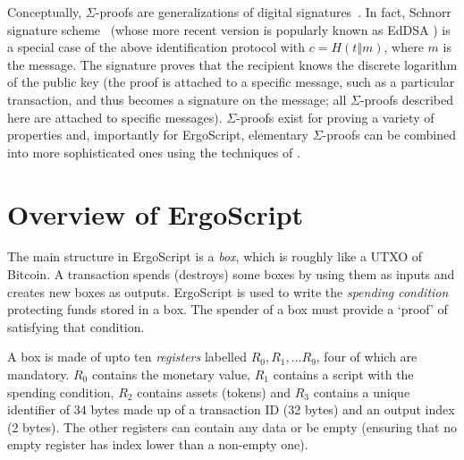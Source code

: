 \documentclass[11pt]{article}
\newcommand{\langname}{ErgoScript\xspace}
\begin{document}
{Conceptually, $\Sigma$-proofs are generalizations of digital signatures~\cite{CL06}.
In fact, Schnorr signature scheme~\cite{Sch91} (whose more recent version is popularly known as EdDSA \cite{BDLSY12,rfc8032}) is a special case of the above identification protocol with $c = H(t \Vert m)$, where $m$ is the message. The signature proves that the recipient knows the discrete logarithm of the public key (the proof is attached to a specific message, such as a particular transaction, and thus becomes a signature on the message; all $\Sigma$-proofs described here are attached to specific messages). $\Sigma$-proofs exist for proving a variety of properties and, importantly for \langname, elementary $\Sigma$-proofs can be combined into more sophisticated ones using the techniques of \cite{CDS94}. 
}

\section{Overview of \langname}
 
 The main structure in \langname is a \emph{box}, which is roughly like a UTXO of Bitcoin. A transaction spends (destroys) some boxes by using them as inputs and creates new boxes as outputs.  \langname is used to write the {\em spending condition} protecting funds stored in a box. The spender of a box must provide a `proof' of satisfying that condition. 
 
 A box is made of upto ten {\em registers} labelled $R_0, R_1,\ldots R_9$, four of which are mandatory. $R_0$ contains the monetary value, $R_1$ contains a script with the spending condition, $R_2$ contains assets (tokens) and $R_3$ contains a unique identifier of 34 bytes made up of a transaction ID (32 bytes) and an output index (2 bytes). The other registers can contain any data or be empty (ensuring that no empty register has index lower than a non-empty one).
 
\end{document}
